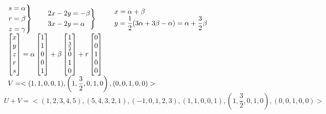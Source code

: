 \begin{enumerate}[label=\color{red}\arabic*), leftmargin=*]
        $\begin{array}{l}
        	\begin{rcases}
        		s=\alpha\\
        		r=\beta\\
        		z=\gamma
        	\end{rcases}\qquad\begin{rcases}
        	2x-2y=-\beta\\
        	3x-2y=\alpha
        	\end{rcases}\qquad\begin{array}{l}
        	x=\alpha+\beta\\
        	y=\dfrac{1}{2}(3\alpha+3\beta-\alpha)=\alpha+\dfrac{3}{2}\beta
        	\end{array}\\
        	\begin{bmatrix}
        		x\\
        		y\\
        		z\\
        		r\\
        		s
        	\end{bmatrix}=\alpha\begin{bmatrix}
        	1\\
        	1\\
        	0\\
        	0\\
        	1
        	\end{bmatrix}+\beta\begin{bmatrix}
        	1\\
        	\frac{3}{2}\\
        	0\\
        	1\\
        	0
        	\end{bmatrix}+r\begin{bmatrix}
        	0\\
        	0\\
        	1\\
        	0\\
        	0
        	\end{bmatrix}\\
        	V=<(1,1,0,0,1),\left(1,\dfrac{3}{2},0,1,0\right),(0,0,1,0,0)>\\
        \end{array}$\\
        
        {\small $U+V=<(1,2,3,4,5),(5,4,3,2,1),(-1,0,1,2,3),(1,1,0,0,1),\left(1,\dfrac{3}{2},0,1,0\right),(0,0,1,0,0)>$}
        

\end{enumerate}
